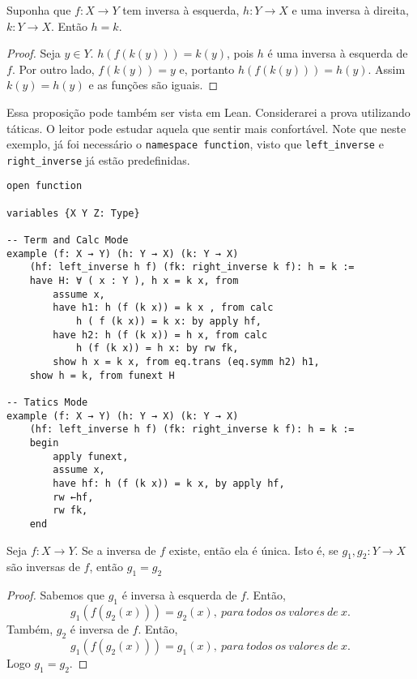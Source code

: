 \begin{theorem}
    \label{prop2}
    Suponha que $f : X \to Y $ tem inversa à esquerda, $h : Y \to X $ e uma inversa à direita, $k : Y \to X $.
    Então $h = k$. 
\end{theorem}
\begin{proof}
    Seja $y \in Y$. $h(f(k(y))) = k(y)$, pois $h$ é uma inversa à esquerda de $f$. 
    Por outro lado, $f(k(y)) = y$ e, portanto $h(f(k(y))) = h(y)$. Assim $k(y) = h(y) $ e as funções são iguais. 
\end{proof}

Essa proposição pode também ser vista em Lean. Considerarei a prova utilizando táticas. O leitor pode estudar 
aquela que sentir mais confortável. Note que neste exemplo, já foi necessário o \lstinline{namespace function}, 
visto que \lstinline{left_inverse} e \lstinline{right_inverse} já estão predefinidas. 

\begin{lstlisting}
open function 

variables {X Y Z: Type}

-- Term and Calc Mode
example (f: X → Y) (h: Y → X) (k: Y → X) 
    (hf: left_inverse h f) (fk: right_inverse k f): h = k :=
    have H: ∀ ( x : Y ), h x = k x, from 
        assume x, 
        have h1: h (f (k x)) = k x , from calc
            h ( f (k x)) = k x: by apply hf, 
        have h2: h (f (k x)) = h x, from calc
            h (f (k x)) = h x: by rw fk,         
        show h x = k x, from eq.trans (eq.symm h2) h1,
    show h = k, from funext H

-- Tatics Mode
example (f: X → Y) (h: Y → X) (k: Y → X) 
    (hf: left_inverse h f) (fk: right_inverse k f): h = k :=
    begin
        apply funext, 
        assume x, 
        have hf: h (f (k x)) = k x, by apply hf, 
        rw ←hf,
        rw fk, 
    end
\end{lstlisting}

\begin{theorem}
    \label{prop3}
    Seja $f: X \to Y$. Se a inversa de $f$ existe, então ela é única. Isto é, se $g_1, g_2: Y \to X$ são inversas 
    de $f$, então $g_1 = g_2$        
\end{theorem}   
\begin{proof}
    Sabemos que $g_1$ é inversa à esquerda de $f$. Então, 
    $$g_1(f(g_2(x))) = g_2(x), ~para~todos~os~valores~de~x.$$ 
    Também, $g_2$ é inversa de $f$. Então, 
    $$g_1(f(g_2(x))) = g_1(x), ~para~todos~os~valores~de~x.$$ Logo $g_1 = g_2$. 
\end{proof}


